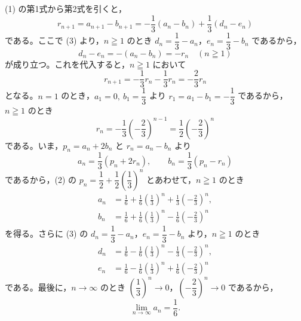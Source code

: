 (1) の第1式から第2式を引くと，
\[
  r_{n+1} = a_{n+1}-b_{n+1} = -\frac{1}{3}(a_{n}-b_{n}) + \frac{1}{3}(d_{n}-e_{n})
\]
である。ここで (3) より，$n\geqq 1$ のとき $d_{n}=\dfrac{1}{3}-a_{n}$，$e_{n}=\dfrac{1}{3}-b_{n}$ であるから，
\[
  d_{n} - e_{n} = -(a_{n}-b_{n}) = -r_{n} \quad (n\geqq 1)
\]
が成り立つ。これを代入すると，$n\geqq 1$ において
\[
  r_{n+1} = -\frac{1}{3}r_{n} - \frac{1}{3}r_{n} = -\frac{2}{3}r_{n}
\]
となる。$n=1$ のとき，$a_{1}=0,\ b_{1}=\dfrac{1}{3}$ より $r_{1}=a_{1}-b_{1}=-\dfrac{1}{3}$ であるから，$n\geqq 1$ のとき
\[
  r_{n} = -\frac{1}{3}\left(-\frac{2}{3}\right)^{n-1} = \frac{1}{2}\left(-\frac{2}{3}\right)^{n}
\]
である。いま，$p_{n}=a_{n}+2b_{n}$ と $r_{n}=a_{n}-b_{n}$ より
\[
  a_{n} = \frac{1}{3}(p_{n}+2r_{n}),\qquad b_{n} = \frac{1}{3}(p_{n}-r_{n})
\]
であるから，(2) の $p_{n}=\dfrac{1}{2}+\dfrac{1}{2}\left(\dfrac{1}{3}\right)^{n}$ とあわせて，$n\geqq 1$ のとき
\begin{align*}
  a_{n} &= \frac{1}{6} + \frac{1}{6}\left(\frac{1}{3}\right)^{n} + \frac{1}{3}\left(-\frac{2}{3}\right)^{n},\\
  b_{n} &= \frac{1}{6} + \frac{1}{6}\left(\frac{1}{3}\right)^{n} - \frac{1}{6}\left(-\frac{2}{3}\right)^{n}
\end{align*}
を得る。さらに (3) の $d_{n}=\dfrac{1}{3}-a_{n}$，$e_{n}=\dfrac{1}{3}-b_{n}$ より，$n\geqq 1$ のとき
\begin{align*}
  d_{n} &= \frac{1}{6} - \frac{1}{6}\left(\frac{1}{3}\right)^{n} - \frac{1}{3}\left(-\frac{2}{3}\right)^{n},\\
  e_{n} &= \frac{1}{6} - \frac{1}{6}\left(\frac{1}{3}\right)^{n} + \frac{1}{6}\left(-\frac{2}{3}\right)^{n}
\end{align*}
である。最後に，$n\to\infty$ のとき $\left(\dfrac{1}{3}\right)^{n}\to 0$，$\left(-\dfrac{2}{3}\right)^{n}\to 0$ であるから，
\[
  \lim_{n\to\infty}a_{n} = \frac{1}{6}.
\]


